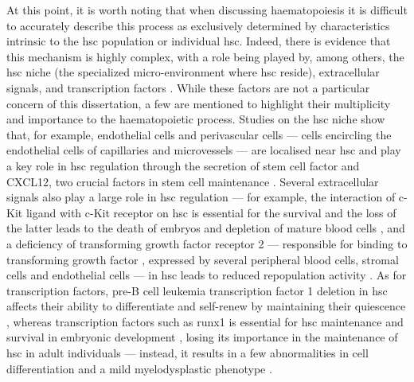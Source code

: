 At this point, it is worth noting that when discussing haematopoiesis it is difficult to accurately describe this process as exclusively determined by characteristics intrinsic to the \ac{hsc} population or individual \ac{hsc}. Indeed, there is evidence that this mechanism is highly complex, with a role being played by, among others, the \ac{hsc} niche (the specialized micro-environment where \ac{hsc} reside), extracellular signals, and transcription factors \cite{Wang2016-oq}. While these factors are not a particular concern of this dissertation, a few are mentioned to highlight their multiplicity and importance to the haematopoietic process. Studies on the \ac{hsc} niche show that, for example, endothelial cells and perivascular cells --- cells encircling the endothelial cells of capillaries and microvessels \cite{Crisan2012-nl} --- are localised near \ac{hsc} \cite{Ding2012-hv,Zhou2014-fd} and play a key role in \ac{hsc} regulation through the secretion of stem cell factor and CXCL12, two crucial factors in stem cell maintenance \cite{Ding2012-hv,Sugiyama2006-vc,Greenbaum2013-rx}. Several extracellular signals also play a large role in \ac{hsc} regulation --- for example, the interaction of c-Kit ligand with c-Kit receptor on \ac{hsc} is essential for the survival and the loss of the latter leads to the death of embryos and depletion of mature blood cells \cite{Huang1990-in}, and a deficiency of transforming growth factor \Beta{} receptor 2 --- responsible for binding to transforming growth factor , expressed by several peripheral blood cells, stromal cells and endothelial cells \cite{Zhao2014-dv} --- in \ac{hsc} leads to reduced repopulation activity \cite{Yamazaki2011-yv}. As for transcription factors, pre-B cell leukemia transcription factor 1 deletion in \ac{hsc} affects their ability to differentiate and self-renew by maintaining their quiescence \cite{Ficara2008-so}, whereas transcription factors such as \ac{runx1} is essential for \ac{hsc} maintenance and survival in embryonic development \cite{Okuda1996-rd}, losing its importance in the maintenance of \ac{hsc} in adult individuals \cite{Ichikawa2004-ow} --- instead, it results in a few abnormalities in cell differentiation and a mild myelodysplastic phenotype \cite{Ichikawa2004-ow,Growney2005-zx}.

